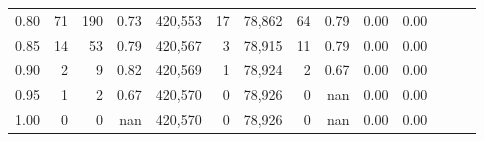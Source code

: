 \begin{tabular}{rrrrrrrrrrrrrr}
0.80 &       71 &     190 &  0.73 &  420,553 &       17 &  78,862 &      64 &  0.79 &  0.00 &      0.00 \\
0.85 &       14 &      53 &  0.79 &  420,567 &        3 &  78,915 &      11 &  0.79 &  0.00 &      0.00 \\
0.90 &        2 &       9 &  0.82 &  420,569 &        1 &  78,924 &       2 &  0.67 &  0.00 &      0.00 \\
0.95 &        1 &       2 &  0.67 &  420,570 &        0 &  78,926 &       0 &   nan &  0.00 &      0.00 \\
1.00 &        0 &       0 &   nan &  420,570 &        0 &  78,926 &       0 &   nan &  0.00 &      0.00 \\
\bottomrule
\end{tabular}

